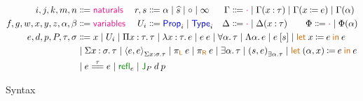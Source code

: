 \documentclass{article}
\title{}
\author{Jonathan Chan}
\newcommand{\meta}[1]{\mathsf{\textcolor{metacolour}{#1}}}
\newcommand{\ind}[1]{\mathsf{\textcolor{indcolour}{#1}}}
\newcommand{\constr}[1]{\mathsf{\textcolor{constrcolour}{#1}}}
\newcommand{\kw}[1]{\mathsf{\textcolor{kwcolour}{#1}}}
\newcommand{\kwopen}[1]{\kw{#1}\:}
\newcommand{\kwbin}[1]{\:\kw{#1}\:}
\newcommand{\poly}[2]{\forall #1 \mathpunct{.} #2}
\newcommand{\suc}[1]{\widehat{#1}}
\newcommand{\fun}[3]{\Pi #1 \mathbin{:} #2 \mathpunct{.} #3}
\renewcommand{\prod}[3]{\Sigma #1 \mathbin{:} #2 \mathpunct{.} #3}
\newcommand{\lam}[3]{\lambda #1 \mathbin{:} #2 \mathpunct{.} #3}
\newcommand{\Lam}[2]{\Lambda #1 \mathpunct{.} #2}
\newcommand{\app}[2]{#1 \: #2}
\newcommand{\App}[2]{#1 \: \mathopen{[} #2 \mathclose{]}}
\newcommand{\letin}[3]{\kwopen{let} #1 \mathbin{\coloneqq} \phantom{} #2 \kwbin{in} #3}
\newcommand{\Type}[1]{\ind{Type}_{#1}}
\newcommand{\Prop}[1]{\ind{Prop}_{#1}}
\newcommand{\annot}[2]{#1 \mathbin{:} #2}
\newcommand{\define}[2]{#1 \mathbin{\coloneqq} #2}
\newcommand{\refl}{\constr{refl}}
\renewcommand{\equal}[3]{#1 \stackrel{#2}{=\joinrel=} #3}
\newcommand{\J}[3]{\constr{J}_{#1} \: #2 \: #3}
\newcommand{\pair}[2]{\mathopen{\langle} #1 \mathpunct{,} #2 \mathclose{\rangle}}
\newcommand{\prjl}[1]{\pi_{\kw{L}} \: #1}
\newcommand{\prjr}[1]{\pi_{\kw{R}} \: #1}
\newcommand{\some}[2]{\exists #1 \mathpunct{.} #2}
\newcommand{\pack}[2]{\mathopen{(} #1 \mathpunct{,} #2 \mathclose{)}}
\newcommand{\unpack}[4]{\kwopen{let} \pack{#1}{#2} \mathbin{\coloneqq} #3 \kwbin{in} #4}
\newcommand{\mt}{\meta{\cdot}}
\begin{document}
\maketitle

\begin{figure}[h]
    \centering
    \begin{align*}
        i, j, k, m, n &\Coloneqq \meta{naturals}
        & r, s &\Coloneqq \alpha \mid \suc{s} \mid \circ \mid \infty 
        & \Gamma &\Coloneqq \mt \mid \Gamma(\annot{x}{\tau}) \mid \Gamma(\define{x}{e}) \mid \Gamma(\alpha) \\
        f, g, w, x, y, z, \alpha, \beta &\Coloneqq \meta{variables}
        & U_i &\Coloneqq \Prop{i} \mid \Type{i}
        & \Delta &\Coloneqq \mt \mid \Delta(\annot{x}{\tau}) \qquad\Phi \Coloneqq \mt \mid \Phi(\alpha) \\
        e, d, p, P, \tau, \sigma &\Coloneqq \mathrlap{x \mid U_{i} \mid \fun{x}{\tau}{\tau} \mid \lam{x}{\tau}{e} \mid \app{e}{e} \mid \poly{\alpha}{\tau} \mid \Lam{\alpha}{e} \mid \App{e}{s} \mid \letin{x}{e}{e}} \\
        &\mid \mathrlap{\prod{x}{\sigma}{\tau} \mid \pair{e}{e}_{\prod{x}{\sigma}{\tau}} \mid \prjl{e} \mid \prjr{e} \mid \some{\alpha}{\tau} \mid \pack{s}{e}_{\some{\alpha}{\tau}} \mid \unpack{\alpha}{x}{e}{e}} \\
        &\mid \mathrlap{\equal{e}{\tau}{e} \mid \refl_{e} \mid \J{P}{d}{p}} \\
    \end{align*}
    \caption{Syntax}
    \label{fig:syntax}
\end{figure}
\end{document}
